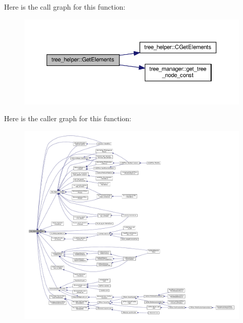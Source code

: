 Here is the call graph for this function\+:
\nopagebreak
\begin{figure}[H]
\begin{center}
\leavevmode
\includegraphics[width=350pt]{d7/d99/classtree__helper_a138ece972399ec580cd0f48ef6a3b0e9_cgraph}
\end{center}
\end{figure}
Here is the caller graph for this function\+:
\nopagebreak
\begin{figure}[H]
\begin{center}
\leavevmode
\includegraphics[width=350pt]{d7/d99/classtree__helper_a138ece972399ec580cd0f48ef6a3b0e9_icgraph}
\end{center}
\end{figure}
\mbox{\label{classtree__helper_a9e9972b08d71d6f422189619714c5067}} 
